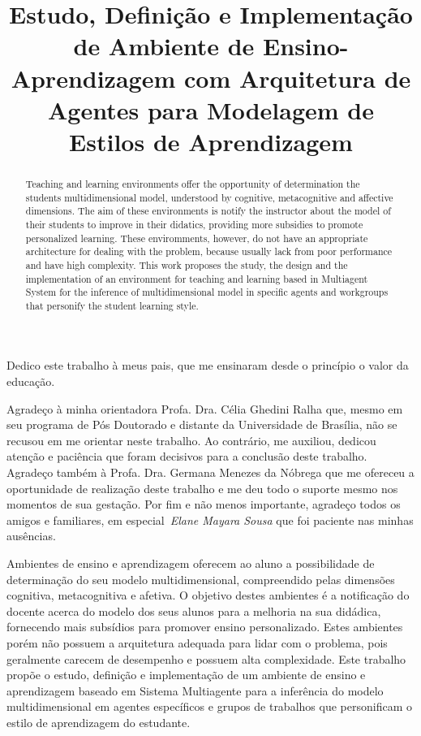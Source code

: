 \documentclass[bacharelado]{unb-cic}
\title{Estudo, Definição e Implementação de Ambiente de Ensino-Aprendizagem com Arquitetura de Agentes para Modelagem de Estilos de Aprendizagem}
\begin{document}
  \maketitle

  \begin{dedicatoria}
  Dedico este trabalho à meus pais, que me ensinaram desde o princípio o valor da educação.
  \end{dedicatoria}

  \begin{agradecimentos}
  Agradeço à minha orientadora Profa. Dra. Célia Ghedini Ralha que, mesmo em seu programa de Pós Doutorado e distante da Universidade de Brasília, não se recusou em me orientar neste trabalho. Ao contrário, me auxiliou, dedicou atenção e paciência que foram decisivos para a conclusão deste trabalho.
  Agradeço também à Profa. Dra. Germana Menezes da Nóbrega que me ofereceu a oportunidade de realização deste trabalho e me deu todo o suporte mesmo nos momentos de sua gestação.
  Por fim e não menos importante, agradeço todos os amigos e familiares, em especial~\emph{Elane Mayara Sousa} que foi paciente nas minhas ausências.
  \end{agradecimentos}

  \begin{resumo}
  Ambientes de ensino e aprendizagem oferecem ao aluno a possibilidade de determinação do seu modelo multidimensional, compreendido pelas dimensões cognitiva, metacognitiva e afetiva. O objetivo destes ambientes é a notificação do docente acerca do modelo dos seus alunos para a melhoria na sua didádica, fornecendo mais subsídios para promover ensino personalizado. Estes ambientes porém não possuem a arquitetura adequada para lidar com o problema, pois geralmente carecem de desempenho e possuem alta complexidade. 
  Este trabalho propõe o estudo, definição e implementação de um ambiente de ensino e aprendizagem baseado em Sistema Multiagente para a inferência do modelo multidimensional em agentes específicos e grupos de trabalhos que personificam o estilo de aprendizagem do estudante.
  \end{resumo}

  \begin{abstract}
  Teaching and learning environments offer the opportunity of determination the students multidimensional model, understood by cognitive, metacognitive and affective dimensions. The aim of these environments is notify the instructor about the model of their students to improve in their didatics, providing more subsidies to promote personalized learning. These enviromments, however, do not have an appropriate architecture for dealing with the problem, because usually lack from poor performance and have high complexity.
  This work proposes the study, the design and the implementation of an environment for teaching and learning based in Multiagent System for the inference of multidimensional model in specific agents and workgroups that personify the student learning style.
  \end{abstract}
\end{document}
